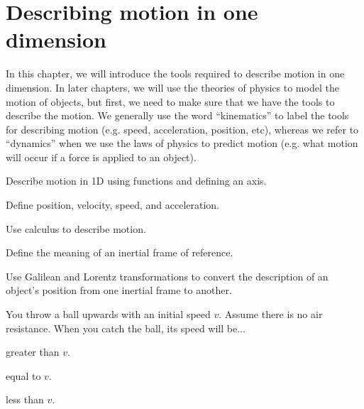 %
\chapter{Describing motion in one dimension}
\label{chapter:describingmotionin1d}
In this chapter, we will introduce the tools required to describe motion in one dimension. In later chapters, we will use the theories of physics to model the motion of objects, but first, we need to make sure that we have the tools to describe the motion. We generally use the word ``kinematics'' to label the tools for describing motion (e.g. speed, acceleration, position, etc), whereas we refer to ``dynamics'' when we use the laws of physics to predict motion (e.g. what motion will occur if a force is applied to an object). 

\begin{learningObjectives}
{\item Describe motion in 1D using functions and defining an axis.
\item Define position, velocity, speed, and acceleration.
\item Use calculus to describe motion.
\item Define the meaning of an inertial frame of reference.
\item Use Galilean and Lorentz transformations to convert the description of an object's position from one inertial frame to another.}
\end{learningObjectives}

\begin{opening}
\begin{MCquestion} {You throw a ball upwards with an initial speed $v$. Assume there is no air resistance. When you catch the ball, its speed will be...}
\item greater than $v$.
\item equal to $v$. \correct
\item less than $v$.
\end{MCquestion}
\end{opening}


